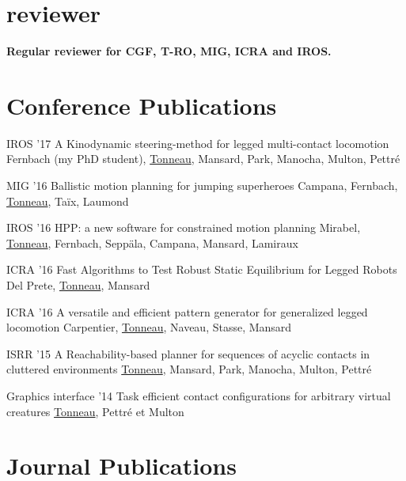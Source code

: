 \documentclass{tccv}
\begin{document}
\section{reviewer}
\textbf{Regular reviewer for CGF, T-RO, MIG, ICRA and IROS.}


\section{Conference Publications}

\begin{eventlist}

\item{IROS '17}
{ A Kinodynamic steering-method for legged multi-contact locomotion}
{Fernbach (my PhD student), \underline{Tonneau}, Mansard, Park, Manocha, Multon, Pettr\'e}

\item{MIG '16}
{Ballistic motion planning for jumping superheroes}
{Campana, Fernbach, \underline{Tonneau}, Ta\"ix, Laumond}

\item{IROS '16}
{HPP: a new software for constrained motion planning }
{Mirabel, \underline{Tonneau}, Fernbach, Sepp\"ala, Campana, Mansard, Lamiraux}

\item{ICRA '16}
{Fast Algorithms to Test Robust Static Equilibrium for Legged Robots}
{Del Prete, \underline{Tonneau},  Mansard}

\item{ICRA '16}
{A versatile and efficient pattern generator for generalized legged locomotion}
{Carpentier, \underline{Tonneau}, Naveau, Stasse,  Mansard}

\item{ISRR '15}
{A Reachability-based planner for sequences
of acyclic contacts in cluttered environments}
{\underline{Tonneau}, Mansard, Park, Manocha, Multon, Pettr\'e}

\item
 {Graphics interface '14}
 {Task efficient contact configurations for 
arbitrary virtual creatures}
 {\underline{Tonneau}, Pettr\'e et Multon} 


\end{eventlist}

\section{Journal Publications}
\end{document}
